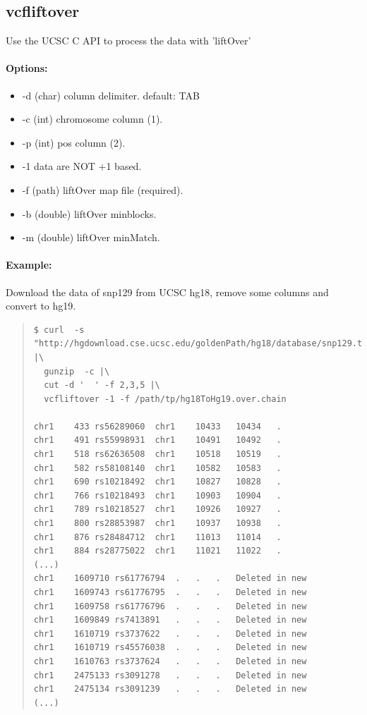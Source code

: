 \documentclass[12pt]{article}
\begin{document}
\subsection{vcfliftover}
Use the UCSC C API to process the data with 'liftOver'
\paragraph{Options:}
\begin{itemize}
\item-d (char) column delimiter. default: TAB
\item-c (int) chromosome column (1).
\item-p (int) pos column (2).
\item-1 data are NOT +1 based.
\item-f (path) liftOver map file (required).
\item-b (double) liftOver minblocks.
\item-m (double) liftOver minMatch.
\end{itemize}

\paragraph{Example:}
Download the data of snp129 from UCSC hg18, remove some columns and convert to hg19.
\begin{quote}
\begin{verbatim}
$ curl  -s "http://hgdownload.cse.ucsc.edu/goldenPath/hg18/database/snp129.txt.gz" |\
  gunzip  -c |\
  cut -d '  ' -f 2,3,5 |\
  vcfliftover -1 -f /path/tp/hg18ToHg19.over.chain 
  
chr1	433	rs56289060	chr1	10433	10434	.
chr1	491	rs55998931	chr1	10491	10492	.
chr1	518	rs62636508	chr1	10518	10519	.
chr1	582	rs58108140	chr1	10582	10583	.
chr1	690	rs10218492	chr1	10827	10828	.
chr1	766	rs10218493	chr1	10903	10904	.
chr1	789	rs10218527	chr1	10926	10927	.
chr1	800	rs28853987	chr1	10937	10938	.
chr1	876	rs28484712	chr1	11013	11014	.
chr1	884	rs28775022	chr1	11021	11022	.
(...)
chr1	1609710	rs61776794	.	.	.	Deleted in new
chr1	1609743	rs61776795	.	.	.	Deleted in new
chr1	1609758	rs61776796	.	.	.	Deleted in new
chr1	1609849	rs7413891	.	.	.	Deleted in new
chr1	1610719	rs3737622	.	.	.	Deleted in new
chr1	1610719	rs45576038	.	.	.	Deleted in new
chr1	1610763	rs3737624	.	.	.	Deleted in new
chr1	2475133	rs3091278	.	.	.	Deleted in new
chr1	2475134	rs3091239	.	.	.	Deleted in new
(...)
\end{verbatim}
\end{quote}
\end{document}
